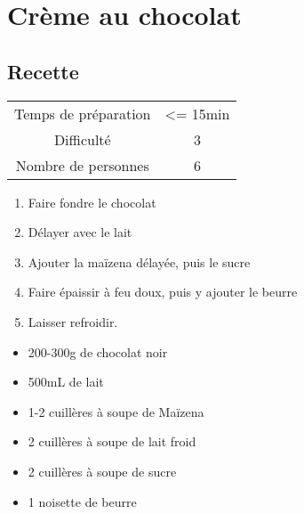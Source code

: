 \newpage
\section{Crème au chocolat}
    \label{sec:Crème au chocolat}
    \subsection{Recette}
    \vspace{1cm}


    \begin{center}
        \begin{tabular}{c|c}
            Temps de préparation & <= 15min \\
            Difficulté & 3 \\
            Nombre de personnes & 6 
        \end{tabular}
    \end{center}{}

    \vspace{1cm}
    \hline
    \vspace{1cm}

    \begin{minipage}{.7\textwidth}
        \begin{enumerate}
            \item Faire fondre le chocolat
	    \item Délayer avec le lait
	    \item Ajouter la maïzena délayée, puis le sucre
	    \item Faire épaissir à feu doux, puis y ajouter le beurre
	    \item Laisser refroidir.

        \end{enumerate}
    \end{minipage}
    \begin{minipage}{.3\textwidth}
        \begin{flushleft}
        \begin{itemize}
            \item 200-300g de chocolat noir
	    \item 500mL de lait
	    \item 1-2 cuillères à soupe de Maïzena
	    \item 2 cuillères à soupe de lait froid
	    \item 2 cuillères à soupe de sucre
	    \item 1 noisette de beurre

        \end{itemize}
        \end{flushleft}
    \end{minipage}
    
